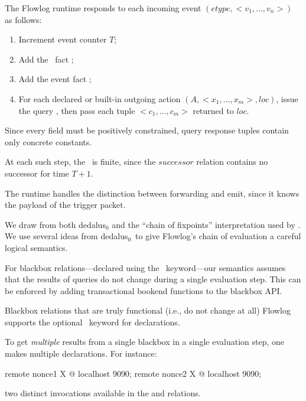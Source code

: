 The Flowlog runtime responds to each incoming event $(etype, <v_1,
..., v_n>)$ as follows:

\begin{enumerate}
\item Increment event counter $T$;
\item Add the \edb\ fact ;
\item Add the event fact ;
\item For each declared or built-in outgoing action $(A, <x_1, ...,
  x_m>, loc)$, issue the query , then pass each
  tuple $<c_1, ..., c_m>$ returned to $loc$. 
\end{enumerate}

\noindent Since every field must be positively constrained, query
response tuples contain only concrete constants. 

At each such step, the \edb\ is finite, since the $successor$ relation
contains no successor for time $T+1$.

The runtime handles the distinction between forwarding and emit, since
it knows the payload of the trigger packet.

\newcommand{\dedalus}{{\sc dedalus}$_0$}

We draw from both \dedalus\cite{} and the ``chain of fixpoints''
interpretation used by \ndlog\cite{}. We use several ideas from
\dedalus\ to give Flowlog's chain of evaluation a careful logical
semantics.



For blackbox relations---declared using the \kwremote\
keyword---our semantics assumes that the results of queries do
not change during a single evaluation step. This can be enforced
by adding transactional bookend functions to the blackbox API. 

Blackbox relations that are truly functional (i.e., do not change
at all) Flowlog supports the optional \kwpure\ keyword for
declarations.

To get \emph{multiple} results from a single blackbox in a single
evaluation step, one makes multiple declarations. For instance:

\begin{flowlog}
  remote nonce1 {X} @ localhost 9090;
  remote nonce2 {X} @ localhost 9090;
\end{flowlog}

\noindent two distinct invocations available in the 
and  relations.

